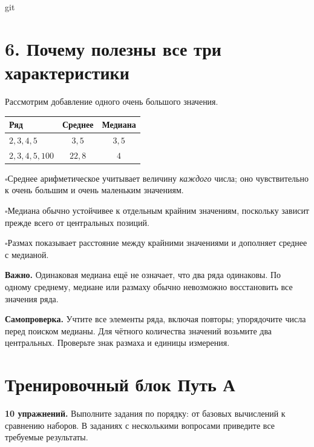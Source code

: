git\documentclass[a4paper,12pt]{article}
\newcommand{\sectionline}{\par\vspace{-0.65em}\noindent{\color{accent!65}\rule{\linewidth}{0.45pt}}\par\vspace{0.25em}}
\newcommand{\knowledge}[1]{\noindent$\square$\enspace #1\par}
\begin{document}
\section*{6. Почему полезны все три характеристики}
\sectionline
Рассмотрим добавление одного очень большого значения.
\begin{center}
\begin{tabularx}{\linewidth}{@{}>{\raggedright\arraybackslash}Xcc@{}}
\toprule
\textbf{Ряд} & \textbf{Среднее} & \textbf{Медиана}\\
\midrule
$2,3,4,5$ & $3{,}5$ & $3{,}5$\\
$2,3,4,5,100$ & $22{,}8$ & $4$\\
\bottomrule
\end{tabularx}
\end{center}
\knowledge{Среднее арифметическое учитывает величину \emph{каждого} числа; оно чувствительно к очень большим и очень маленьким значениям.}
\knowledge{Медиана обычно устойчивее к отдельным крайним значениям, поскольку зависит прежде всего от центральных позиций.}
\knowledge{Размах показывает расстояние между крайними значениями и дополняет среднее с медианой.}

\textbf{Важно.} Одинаковая медиана ещё не означает, что два ряда одинаковы. По одному среднему, медиане или размаху обычно невозможно восстановить все значения ряда.

\textbf{Самопроверка.} Учтите все элементы ряда, включая повторы; упорядочите числа перед поиском медианы. Для чётного количества значений возьмите два центральных. Проверьте знак размаха и единицы измерения.

\clearpage
\section*{Тренировочный блок \textbullet{} Путь А}
\sectionline
\textbf{10 упражнений.} Выполните задания по порядку: от базовых вычислений к сравнению наборов. В заданиях с несколькими вопросами приведите все требуемые результаты.
\end{document}

